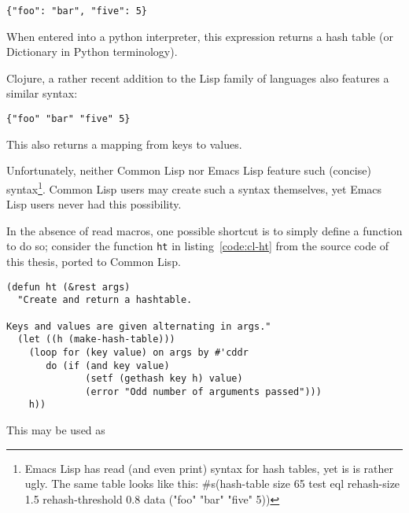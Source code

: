 \documentclass[a4paper,10pt,twoside]{report}
\newcommand{\el}{Emacs Lisp}
\newcommand{\cl}{Common Lisp}
\newcommand{\fun}[1]{\texttt{#1}}
\begin{document}

\begin{lstlisting}[style=pythoncode]
{"foo": "bar", "five": 5}
\end{lstlisting}

When entered into a python interpreter, this expression returns a hash table (or
Dictionary in Python terminology).

Clojure, a rather recent addition to the Lisp family of languages also features
a similar syntax:


\begin{lstlisting}[style=lispinline]
{"foo" "bar" "five" 5}
\end{lstlisting}

This also returns a mapping from keys to values.

Unfortunately, neither \cl{} nor \el{} feature such (concise)
syntax\footnote{\el{} has read (and even print) syntax for hash tables, yet is
  is rather ugly.  The same table looks like this: \#s(hash-table size 65 test
  eql rehash-size 1.5 rehash-threshold 0.8 data ("foo" "bar" "five" 5))}.  \cl{}
users may create such a syntax themselves, yet \el{} users never had this
possibility.

In the absence of read macros, one possible shortcut is to simply define a
function to do so; consider the function \fun{ht} in listing~\ref{code:cl-ht}
from the source code of this thesis, ported to \cl{}.



\begin{lstlisting}[style=lispcode,caption={Creating a hash
  table.},label={code:cl-ht}]
(defun ht (&rest args)
  "Create and return a hashtable.

Keys and values are given alternating in args."
  (let ((h (make-hash-table)))
    (loop for (key value) on args by #'cddr
       do (if (and key value)
              (setf (gethash key h) value)
              (error "Odd number of arguments passed")))
    h))
\end{lstlisting}
This may be used as
\end{document}
